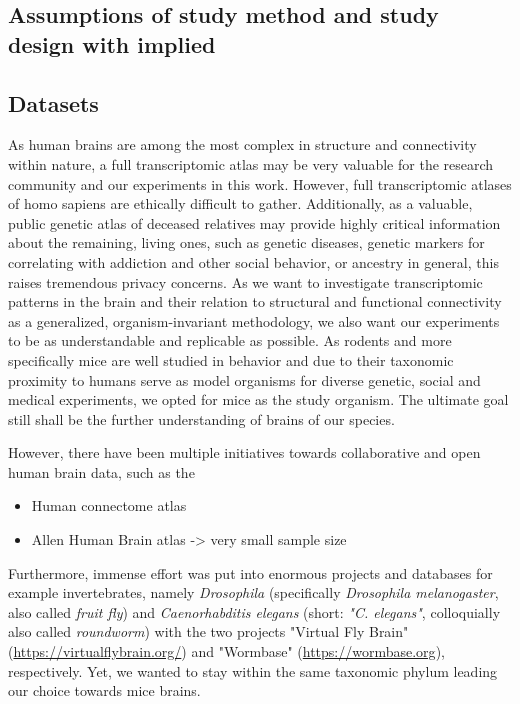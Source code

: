 \documentclass[]{article}
\renewcommand{\cite}{\citep}
\begin{document}
\subsection*{Assumptions of study method and study design with implied }

\subsection{Datasets}
\label{sec:datasets}
As human brains are among the most complex in structure and connectivity within nature, a full transcriptomic atlas may be very valuable for the research community and our experiments in this work. However, full transcriptomic atlases of homo sapiens are ethically difficult to gather. Additionally, as a valuable, public genetic atlas of deceased relatives may provide highly critical information about the remaining, living ones, such as genetic diseases, genetic markers for correlating with addiction and other social behavior, or ancestry in general, this raises tremendous privacy concerns. As we want to investigate transcriptomic patterns in the brain and their relation to structural and functional connectivity as a generalized, organism-invariant methodology, we also want our experiments to be as understandable and replicable as possible. As rodents and more specifically mice are well studied in behavior and due to their taxonomic proximity to humans serve as model organisms for diverse genetic, social and medical experiments, we opted for mice as the study organism. The ultimate goal still shall be the further understanding of brains of our species.

However, there have been multiple initiatives towards collaborative and open human brain data, such as the 
\begin{itemize}
	\item Human connectome atlas
	\item Allen Human Brain atlas -> very small sample size
\end{itemize}
Furthermore, immense effort was put into enormous projects and databases for example invertebrates, namely \textit{Drosophila} (specifically \textit{Drosophila melanogaster}, also called \textit{fruit fly}) and \textit{Caenorhabditis elegans} (short: \textit{"C. elegans"}, colloquially also called \textit{roundworm}) with the two projects "Virtual Fly Brain" \cite{milyaev2012virtual} (\href{https://virtualflybrain.org/}{https://virtualflybrain.org/}) and "Wormbase" \cite{lee2003building, davis2022wormbase} (\href{https://wormbase.org}{https://wormbase.org}), respectively. Yet, we wanted to stay within the same taxonomic phylum leading our choice towards mice brains. 
\end{document}
